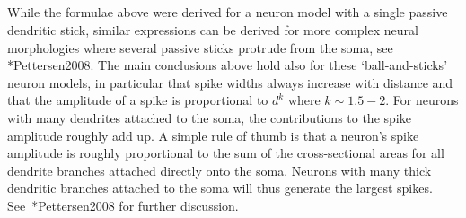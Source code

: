 \subsection{}
While the formulae above were derived for a neuron model with a single passive dendritic stick, 
similar expressions can be derived for more complex neural morphologies 
where several passive sticks protrude from the soma, see \citeasnoun**{Pettersen2008}. 
The main conclusions above hold also for these `ball-and-sticks' neuron models, 
in particular that spike widths always increase with distance and that the amplitude 
of a spike is proportional to $d^{k}$ where $k\sim1.5-2$.
For neurons with many dendrites attached to the soma, the contributions to the spike amplitude roughly add up. 
A simple rule of thumb is that a neuron's spike amplitude is roughly proportional 
to the sum of the cross-sectional areas for all dendrite branches attached directly onto the soma. 
Neurons with many thick dendritic branches attached to the soma will thus generate the largest spikes. See~\citeasnoun**{Pettersen2008} for further discussion.


